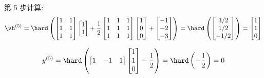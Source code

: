 \documentclass[openany]{ctexbook}
\theoremstyle{kaiti}
\theoremstyle{normal}
\begin{document}
第 5 步计算:
\begin{equation}
  \vh^{(5)}
  =\hard\left(
    \begin{bmatrix}
      1 & 1 \\
      1 & 1 \\
      1 & 1 \\
    \end{bmatrix}
    \begin{bmatrix}
      1 \\ 1 \\
    \end{bmatrix}
    +\frac{1}{2}
    \begin{bmatrix}
      1 & 1 & 1 \\
      1 & 1 & 1 \\
      1 & 1 & 1 \\
    \end{bmatrix}
    \begin{bmatrix}
      1 \\ 0 \\ 0 \\
    \end{bmatrix}
    +
    \begin{bmatrix}
      -1 \\ -2 \\ -3 \\
    \end{bmatrix}
  \right)
  =\hard\left(
    \begin{bmatrix}
      3/2 \\ 1/2 \\ -1/2 \\
    \end{bmatrix}
  \right)
  =
  \begin{bmatrix}
    1 \\ 1 \\ 0 \\
  \end{bmatrix}
\end{equation}

\begin{equation}
  y^{(5)}
  =\hard\left(
    \begin{bmatrix}
      1 & -1 & 1 \\
    \end{bmatrix}
    \begin{bmatrix}
      1 \\ 1 \\ 0 \\
    \end{bmatrix}
    -\frac{1}{2}
  \right)
  =\hard\left(
    -\frac{1}{2}
  \right)
  =0
\end{equation}
\end{document}

